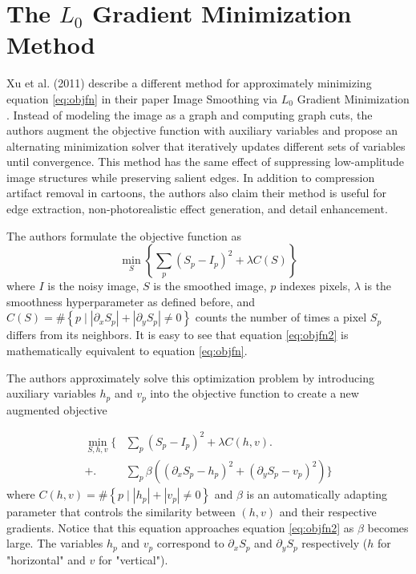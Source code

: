 \documentclass[10pt,twocolumn,letterpaper]{article}
\begin{document}
\section{The $L_0$ Gradient Minimization Method}
Xu et al. (2011) describe a different method for approximately minimizing equation \ref{eq:objfn} in their paper Image Smoothing via $L_0$ Gradient Minimization \cite{xu2011image}. Instead of modeling the image as a graph and computing graph cuts, the authors augment the objective function with auxiliary variables and propose an alternating minimization solver that iteratively updates different sets of variables until convergence. This method has the same effect of suppressing low-amplitude image structures while preserving salient edges. In addition to compression artifact removal in cartoons, the authors also claim their method is useful for edge extraction, non-photorealistic effect generation, and detail enhancement.

The authors formulate the objective function as
\begin{equation} \label{eq:objfn2}
\min_S \left\lbrace \sum_p(S_p - I_p)^2 + \lambda C(S) \right\rbrace
\end{equation}
where $I$ is the noisy image, $S$ is the smoothed image, $p$ indexes pixels, $\lambda$ is the smoothness hyperparameter as defined before, and $C(S) = \#\left\lbrace p \mid |\partial_xS_p| + |\partial_yS_p| \neq 0 \right\rbrace$ counts the number of times a pixel $S_p$ differs from its neighbors. It is easy to see that equation \ref{eq:objfn2} is mathematically equivalent to equation \ref{eq:objfn}.

The authors approximately solve this optimization problem by introducing auxiliary variables $h_p$ and $v_p$ into the objective function to create a new augmented objective

\begin{align*}
\min_{S,h,v} \Biggl\lbrace &\sum_p(S_p - I_p)^2 + \lambda C(h, v) \Biggr.\\
+ \Biggl. &\sum_p\beta((\partial_xS_p - h_p)^2 + (\partial_yS_p - v_p)^2) \Biggr\rbrace
\end{align*}
where $C(h, v) = \#\left\lbrace p \mid |h_p| + |v_p| \neq 0 \right\rbrace$ and $\beta$ is an automatically adapting parameter that controls the similarity between $(h, v)$ and their respective gradients. Notice that this equation approaches equation \ref{eq:objfn2} as $\beta$ becomes large. The variables $h_p$ and $v_p$ correspond to $\partial_xS_p$ and $\partial_yS_p$ respectively ($h$ for "horizontal" and $v$ for "vertical").
\end{document}
